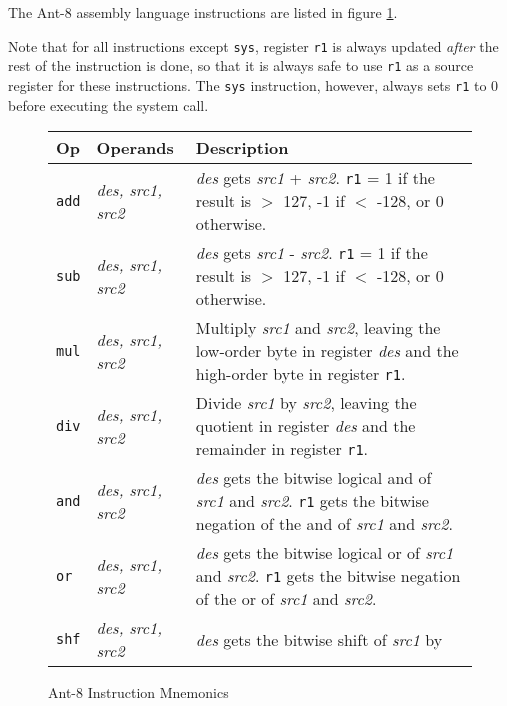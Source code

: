 The Ant-8 assembly language instructions are listed in figure
\ref{mnemonic-table}.

Note that for all instructions except {\tt sys}, register {\tt r1} is
always updated {\em after} the rest of the instruction is done, so
that it is always safe to use {\tt r1} as a source register for these
instructions.  The {\tt sys} instruction, however, always sets {\tt r1} to 0
before executing the system call.

\begin{figure}
\caption{ \label{mnemonic-table} Ant-8 Instruction Mnemonics }
\vspace{3mm}
\noindent
\begin{tabular}{|ll|p{4.5in}|}
\hline
        {\bf Op}        & {\bf Operands}        & {\bf Description}     \\
\hline
\hline
        {\tt add}       & {\em des, src1, src2} &
                {\em des} gets {\em src1} + {\em src2}.
                {\tt r1} = 1 if the result is $>$ 127, -1 if $<$ -128, or
		0 otherwise. \\
\hline
        {\tt sub}       & {\em des, src1, src2} &
                {\em des} gets {\em src1} - {\em src2}.
                {\tt r1} = 1 if the result is $>$ 127, -1 if $<$ -128, or
		0 otherwise. \\
\hline
        {\tt mul}       & {\em des, src1, src2} &
                Multiply {\em src1} and {\em src2},
                leaving the low-order byte in register {\em des}
                and the high-order byte in register {\tt r1}. \\
\hline
        {\tt div}       & {\em des, src1, src2} &
                Divide {\em src1} by {\em src2},
                leaving the quotient in register {\em des}
                and the remainder in register {\tt r1}. \\
\hline
        {\tt and}       & {\em des, src1, src2} &
                {\em des} gets the bitwise logical {\sc and} of
                {\em src1} and {\em src2}.  {\tt r1} gets the
                bitwise negation of the {\sc and} of {\em src1} and {\em src2}. \\
\hline
        {\tt or}        & {\em des, src1, src2} &
                {\em des} gets the bitwise logical {\sc or} of
                {\em src1} and {\em src2}.  {\tt r1} gets the
                bitwise negation of the {\sc or} of {\em src1} and {\em src2}. \\
\hline
        {\tt shf}        & {\em des, src1, src2} &
		{\em des} gets the bitwise shift of {\em src1} by

\end{tabular}
\end{figure}
